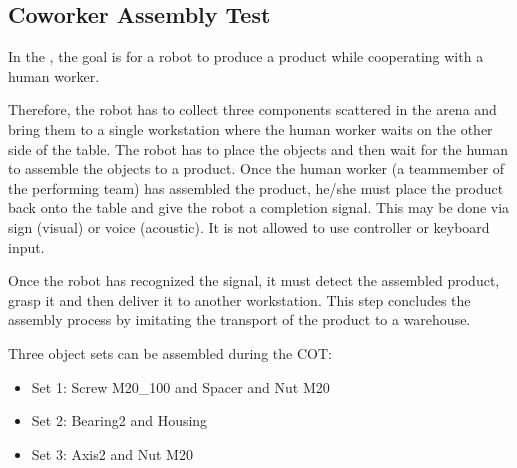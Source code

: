
\subsection{Coworker Assembly Test}

In the , 
the goal is for a robot to produce a product while cooperating with a human worker.

Therefore, the robot has to collect three components scattered in the arena and bring them to a single workstation where the human worker waits on the other side of the table.
The robot has to place the objects and then wait for the human to assemble the objects to a product.
Once the human worker (a teammember of the performing team) has assembled the product, he/she must place the product back onto the table and give the robot a completion signal. This may be done via sign (visual) or voice (acoustic). It is not allowed to use controller or keyboard input.

Once the robot has recognized the signal, 
it must detect the assembled product, grasp it and then deliver it to another workstation.
This step concludes the assembly process by imitating the transport of the product to a warehouse.

Three object sets can be assembled during the COT: 
\begin{itemize}
	\item Set 1: Screw M20\_100 and Spacer and Nut M20
	\item Set 2: Bearing2 and  Housing
	\item Set 3: Axis2 and Nut M20  
\end{itemize}
